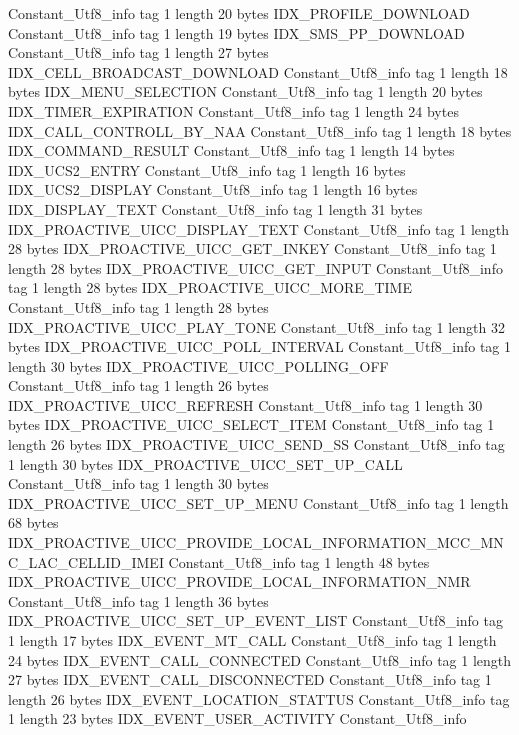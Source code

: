 {{{		}
		Constant_Utf8_info {
			tag	1
			length	20
			bytes	IDX_PROFILE_DOWNLOAD
		}
		Constant_Utf8_info {
			tag	1
			length	19
			bytes	IDX_SMS_PP_DOWNLOAD
		}
		Constant_Utf8_info {
			tag	1
			length	27
			bytes	IDX_CELL_BROADCAST_DOWNLOAD
		}
		Constant_Utf8_info {
			tag	1
			length	18
			bytes	IDX_MENU_SELECTION
		}
		Constant_Utf8_info {
			tag	1
			length	20
			bytes	IDX_TIMER_EXPIRATION
		}
		Constant_Utf8_info {
			tag	1
			length	24
			bytes	IDX_CALL_CONTROLL_BY_NAA
		}
		Constant_Utf8_info {
			tag	1
			length	18
			bytes	IDX_COMMAND_RESULT
		}
		Constant_Utf8_info {
			tag	1
			length	14
			bytes	IDX_UCS2_ENTRY
		}
		Constant_Utf8_info {
			tag	1
			length	16
			bytes	IDX_UCS2_DISPLAY
		}
		Constant_Utf8_info {
			tag	1
			length	16
			bytes	IDX_DISPLAY_TEXT
		}
		Constant_Utf8_info {
			tag	1
			length	31
			bytes	IDX_PROACTIVE_UICC_DISPLAY_TEXT
		}
		Constant_Utf8_info {
			tag	1
			length	28
			bytes	IDX_PROACTIVE_UICC_GET_INKEY
		}
		Constant_Utf8_info {
			tag	1
			length	28
			bytes	IDX_PROACTIVE_UICC_GET_INPUT
		}
		Constant_Utf8_info {
			tag	1
			length	28
			bytes	IDX_PROACTIVE_UICC_MORE_TIME
		}
		Constant_Utf8_info {
			tag	1
			length	28
			bytes	IDX_PROACTIVE_UICC_PLAY_TONE
		}
		Constant_Utf8_info {
			tag	1
			length	32
			bytes	IDX_PROACTIVE_UICC_POLL_INTERVAL
		}
		Constant_Utf8_info {
			tag	1
			length	30
			bytes	IDX_PROACTIVE_UICC_POLLING_OFF
		}
		Constant_Utf8_info {
			tag	1
			length	26
			bytes	IDX_PROACTIVE_UICC_REFRESH
		}
		Constant_Utf8_info {
			tag	1
			length	30
			bytes	IDX_PROACTIVE_UICC_SELECT_ITEM
		}
		Constant_Utf8_info {
			tag	1
			length	26
			bytes	IDX_PROACTIVE_UICC_SEND_SS
		}
		Constant_Utf8_info {
			tag	1
			length	30
			bytes	IDX_PROACTIVE_UICC_SET_UP_CALL
		}
		Constant_Utf8_info {
			tag	1
			length	30
			bytes	IDX_PROACTIVE_UICC_SET_UP_MENU
		}
		Constant_Utf8_info {
			tag	1
			length	68
			bytes	IDX_PROACTIVE_UICC_PROVIDE_LOCAL_INFORMATION_MCC_MNC_LAC_CELLID_IMEI
		}
		Constant_Utf8_info {
			tag	1
			length	48
			bytes	IDX_PROACTIVE_UICC_PROVIDE_LOCAL_INFORMATION_NMR
		}
		Constant_Utf8_info {
			tag	1
			length	36
			bytes	IDX_PROACTIVE_UICC_SET_UP_EVENT_LIST
		}
		Constant_Utf8_info {
			tag	1
			length	17
			bytes	IDX_EVENT_MT_CALL
		}
		Constant_Utf8_info {
			tag	1
			length	24
			bytes	IDX_EVENT_CALL_CONNECTED
		}
		Constant_Utf8_info {
			tag	1
			length	27
			bytes	IDX_EVENT_CALL_DISCONNECTED
		}
		Constant_Utf8_info {
			tag	1
			length	26
			bytes	IDX_EVENT_LOCATION_STATTUS
		}
		Constant_Utf8_info {
			tag	1
			length	23
			bytes	IDX_EVENT_USER_ACTIVITY
		}
		Constant_Utf8_info {
}}}
